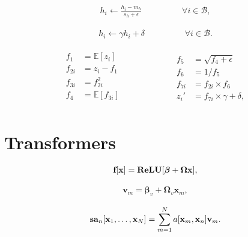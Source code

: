 \documentclass[letterpaper,twoside,openany, titlepage,oldfontcommands,titles,dvipsnames]{memoir}
\begin{document}
\begin{eqnarray}\label{eq:residual_bn_apply}
 h_i \leftarrow \frac{h_i-m_{h}}{s_{h}+\epsilon}\hspace{2cm}\forall i\in\mathcal{B},
 \end{eqnarray}

\begin{eqnarray}
 h_i \leftarrow \gamma h_i + \delta\hspace{2cm}\forall i\in\mathcal{B}.
 \end{eqnarray}

\begin{eqnarray}\label{eq:residual_prob_forward}
 \begin{split}
 f_{1} &= \mathbb{E}[z_{i}]\\
 f_{2i} &= z_{i} - f_{1}\\
 f_{3i} &= f_{2i}^2\\
 f_{4} &= \mathbb{E}[f_{3i}] \\
 \end{split}
 \qquad\qquad\qquad
 \begin{split}
 f_{5} &= \sqrt{f_{4}+\epsilon} \\
 f_{6} &= 1/f_{5}\\
 f_{7i} &= f_{2i}\times f_{6} \\
 z_{i}' &= f_{7i} \times \gamma + \delta,
 \end{split}
 \end{eqnarray}

\chapter{Transformers}


\begin{eqnarray}
  \mbox{{\bf f}}[\mathbf{x}] = \mbox{{\bf ReLU}}[\boldsymbol\beta +\boldsymbol\Omega\mathbf{x}],
 \end{eqnarray}



\begin{eqnarray}\label{eq:transformer_values}
  \mathbf{v}_{m} = \boldsymbol\beta_{v}+\boldsymbol\Omega_{v}\mathbf{x}_{m},
 \end{eqnarray}

\begin{eqnarray}\label{eq:transformer_sattention1}
  \mbox{{\bf sa}}_{n}[\mathbf{x}_{1},\ldots, \mathbf{x}_{N}] = \sum_{m=1}^{N}a[\mathbf{x}_{m}, \mathbf{x}_{n}]\mathbf{v}_{m}.
 \end{eqnarray}
\end{document}
